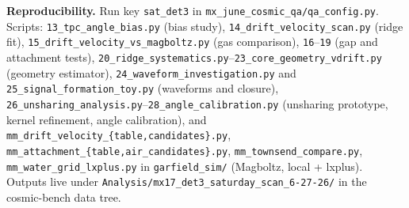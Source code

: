 \documentclass[11pt,a4paper]{article}
\begin{document}
\vspace{4mm}
{\sloppy
\noindent\textbf{Reproducibility.}  Run key \texttt{sat\_det3} in
\texttt{mx\_june\_cosmic\_qa/qa\_config.py}.  Scripts:
\texttt{13\_tpc\_angle\_bias.py} (bias study),
\texttt{14\_drift\_velocity\_scan.py} (ridge fit),
\texttt{15\_drift\_velocity\_vs\_magboltz.py} (gas comparison),
\texttt{16}--\texttt{19} (gap and attachment tests),
\texttt{20\_ridge\_systematics.py}--\texttt{23\_core\_geometry\_vdrift.py}
(geometry estimator), \texttt{24\_waveform\_investigation.py} and
\texttt{25\_signal\_formation\_toy.py} (waveforms and closure),
\texttt{26\_unsharing\_analysis.py}--\texttt{28\_angle\_calibration.py}
(unsharing prototype, kernel refinement, angle calibration), and
\texttt{mm\_drift\_velocity\_\{table,candidates\}.py},
\texttt{mm\_attachment\_\{table,air\_candidates\}.py},
\texttt{mm\_townsend\_compare.py},
\texttt{mm\_water\_grid\_lxplus.py} in
\texttt{garfield\_sim/} (Magboltz, local + lxplus).  Outputs live under
\texttt{Analysis/mx17\_det3\_saturday\_scan\_6-27-26/} in the cosmic-bench
data tree.\par}
\end{document}
